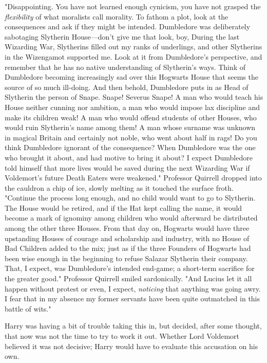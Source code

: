 "Disappointing. You have not learned enough cynicism, you have not grasped the 
\emph{flexibility} of what moralists call morality. To fathom a plot, look at 
the consequences and ask if they might be intended. Dumbledore was deliberately 
sabotaging Slytherin House---don't give me that look, boy,  During the last Wizarding War, Slytherins filled out my ranks of 
underlings, and other Slytherins in the Wizengamot supported me. Look at it 
from Dumbledore's perspective, and remember that he has no native understanding 
of Slytherin's ways. Think of Dumbledore becoming increasingly sad over this 
Hogwarts House that seems the source of so much ill-doing. And then behold, 
Dumbledore puts in as Head of Slytherin the person of Snape. Snape! Severus 
Snape! A man who would teach his House neither cunning nor ambition, a man who 
would impose lax discipline and make its children weak! A man who would offend 
students of other Houses, who would ruin Slytherin's name among them! A man 
whose surname was unknown in magical Britain and certainly not noble, who went 
about half in rags! Do you think Dumbledore ignorant of the consequence? When 
Dumbledore was the one who brought it about, and had motive to bring it about? 
I expect Dumbledore told himself that more lives would be saved during the next 
Wizarding War if Voldemort's future Death Eaters were weakened." Professor 
Quirrell dropped into the cauldron a chip of ice, slowly melting as it touched 
the surface froth. "Continue the process long enough, and no child would want 
to go to Slytherin. The House would be retired, and if the Hat kept calling the 
name, it would become a mark of ignominy among children who would afterward be 
distributed among the other three Houses. From that day on, Hogwarts would have 
three upstanding Houses of courage and scholarship and industry, with no House 
of Bad Children added to the mix; just as if the three Founders of Hogwarts had 
been wise enough in the beginning to refuse Salazar Slytherin their company. 
That, I expect, was Dumbledore's intended end-game; a short-term sacrifice for 
the greater good." Professor Quirrell smiled sardonically. "And Lucius let it 
all happen without protest or even, I expect, \emph{noticing} that anything was 
going awry. I fear that in my absence my former servants have been quite 
outmatched in this battle of wits."

Harry was having a bit of trouble taking this in, but decided, after some 
thought, that now was not the time to try to work it out. Whether Lord 
Voldemort believed it was not decisive; Harry would have to evaluate this 
accusation on his own.

